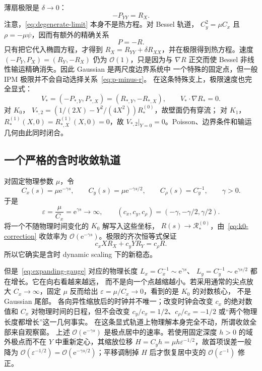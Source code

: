 \documentclass[11pt,a4paper,fontset=fandol]{ctexart}
\newcommand{\e}{\mathrm e}
\newcommand{\grad}{\nabla}
\newcommand{\Order}{\mathcal O}
\begin{document}
薄扇极限是 $\delta\to0$：
\begin{equation}
  -P_{YY}=R_X.
  \label{eq:degenerate-limit}
\end{equation}
注意，\eqref{eq:degenerate-limit} 本身不是热方程。对 Bessel 轨道，
$C_y^2=\mu C_x$ 且 $\rho=-\mu\psi$，因而有额外的精确关系
\begin{equation}
  P=-R.
  \label{eq:p-minus-r}
\end{equation}
只有把它代入椭圆方程，才得到
$R_X=R_{YY}+\delta R_{XX}$，并在极限得到热方程。速度
$(-P_Y,P_X)=(R_Y,-R_X)$ 仍为 $\Order(1)$，只是因为与 $\grad R$
正交而使 Bessel 非线性输运精确消失。因此 Gaussian 是两尺度边界系统中
一个特殊的固定点，但一般 IPM 极限并不会自动选择关系~\eqref{eq:p-minus-r}。
在这条特殊支上，极限速度也完全显式：
\begin{equation}
  V_*=(-P_{*,Y},P_{*,X})=(R_{*,Y},-R_{*,X}),
  \qquad V_*\cdot\grad R_*=0.
\end{equation}
对 $K_0$，
$V_{*,2}=(1/(2X)-Y^2/(4X^2))R_*^{(0)}$，故壁面仍有穿流；
对 $K_1$，$R_*^{(1)}(X,0)=R_{*,X}^{(1)}(X,0)=0$，故
$V_{*,2}|_{Y=0}=0$。Poisson、边界条件和输运几何由此同时闭合。

\subsection{一个严格的含时收敛轨道}

对固定物理参数 $\mu$，令
\begin{equation}
  C_x(s)=\mu\e^{-\gamma s},
  \qquad
  C_y(s)=\mu\e^{-\gamma s/2},
  \qquad
  C_\rho(s)=C_y^{-1},
  \qquad \gamma>0.
  \label{eq:expanding-gauge}
\end{equation}
于是
\begin{equation}
  \varepsilon=\frac{\mu}{C_x}=\e^{\gamma s}\to\infty,
  \qquad
  (c_x,c_y,c_\rho)=(-\gamma,-\gamma/2,\gamma/2).
\end{equation}
将一个不随物理时间变化的 $K_0$ 解写入这些坐标，
$R(s)\to\mathcal R^{(0)}_*$，由~\eqref{eq:k0-correction} 收敛率为
$\Order(\e^{-\gamma s})$。极限的齐次恒等式保证
\begin{equation}
  c_xX R_X+c_yYR_Y=c_\rho R.
\end{equation}
所以它确实是含时 dynamic scaling 下的新稳态。

但是~\eqref{eq:expanding-gauge} 对应的物理长度
$L_x=C_x^{-1}\sim\e^{\gamma s}$、
$L_y=C_y^{-1}\sim\e^{\gamma s/2}$ 都在增长。它在向右看越来越远，
而不是向一个点越缩越小。若采用通常的尖点放大 $C_x\to\infty$，固定
$\mu$ 反而给出 $\varepsilon=\mu/C_x\to0$，看到的是 $K_0$ 的对数核心，
不是 Gaussian 尾部。
各向异性缩放后的时钟并不唯一；改变时钟会改变 $c_x$ 的绝对数值和
$C_x$ 对物理时间的日程，但不会改变
$c_y/c_x=1/2$、$c_\rho/c_x=-1/2$ 或“两个物理长度都增长”这一几何事实。
在这条显式轨道上物理解本身完全不动，所谓收敛全部来自观察窗。
上述 $\Order(\e^{-\gamma s})$ 是极点居中的速率。若使用固定深度 $h>0$
的域外极点而不在 $Y$ 中重新定心，其缩放位移
$H=C_yh=\mu h\varepsilon^{-1/2}$，故首项误差一般降为
$\Order(\varepsilon^{-1/2})=\Order(\e^{-\gamma s/2})$；平移调制掉 $H$
后才恢复居中支的 $\Order(\varepsilon^{-1})$ 修正。
\end{document}
